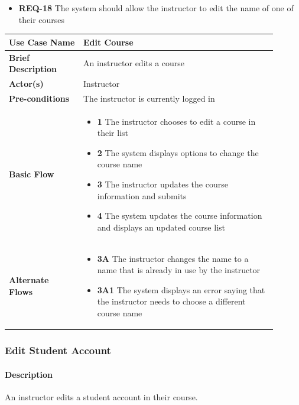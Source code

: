 \documentclass{article}
\begin{document}
\begin{itemize}
  \item \textbf{REQ-18} The system should allow the instructor to edit the name of one of their courses
\end{itemize}

\begin{tabular}{| p{0.25\linewidth} | p{0.65\linewidth} |}
  \hline
  \textbf{Use Case Name} & Edit Course\\
  \hline
  \textbf{Brief Description} & An instructor edits a course\\
  \hline
  \textbf{Actor(s)} & Instructor \\
  \hline
  \textbf{Pre-conditions} & The instructor is currently logged in\\
  \hline
  \textbf{Basic Flow} & \begin{itemize}
    \item[] \textbf{1} The instructor chooses to edit a course in their list
    \item[] \textbf{2} The system displays options to change the course name
    \item[] \textbf{3} The instructor updates the course information and submits
    \item[] \textbf{4} The system updates the course information and displays an updated course list
  \end{itemize}\\
  \hline
  \textbf{Alternate Flows} & \begin{itemize}
    \item[] \textbf{3A} The instructor changes the name to a name that is already in use by the instructor
    \item[] \textbf{3A1} The system displays an error saying that the instructor needs to choose a different course name
  \end{itemize}\\
  \hline
\end{tabular}

\subsubsection{Edit Student Account}

\paragraph{Description} An instructor edits a student account in their course.
\end{document}
